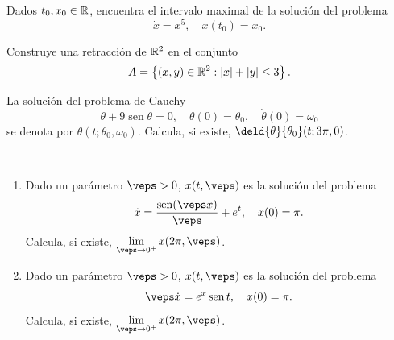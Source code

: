 \documentclass[12pt]{article}
\begin{document}
    \begin{ejercicio}
        Dados $t_0, x_0 \in \mathbb{R}$, encuentra el intervalo maximal de la solución del problema
        \[
        \dot{x} = x^5, \quad x(t_0) = x_0.
        \]
    \end{ejercicio}

    \begin{ejercicio}
        Construye una retracción de $\mathbb{R}^2$ en el conjunto
        \[
        A = \left\{(x,y) \in \mathbb{R}^2 : |x| + |y| \leq 3\right\}.
        \]
    \end{ejercicio}

    \begin{ejercicio}
        La solución del problema de Cauchy
        \[
        \ddot{\theta} + 9 \operatorname{sen} \theta = 0, \quad \theta(0) = \theta_0, \quad \dot{\theta}(0) = \omega_0
        \]
        se denota por $\theta(t; \theta_0, \omega_0)$. Calcula, si existe, $\deld{\theta}{\theta_0}(t; 3\pi, 0)$.
    \end{ejercicio}

    \begin{ejercicio}~
        \begin{enumerate}[label=\roman*)]
            \item Dado un parámetro $\veps > 0$, $x(t, \veps)$ es la solución del problema
            \[
            \dot{x} = \frac{\operatorname{sen}(\veps x)}{\veps} + e^t, \quad x(0) = \pi.
            \]
            Calcula, si existe, $\lim\limits_{\veps \to 0^+} x(2\pi, \veps)$.
            \item Dado un parámetro $\veps > 0$, $x(t, \veps)$ es la solución del problema
            \[
            \veps \dot{x} = e^x \operatorname{sen} t, \quad x(0) = \pi.
            \]
            Calcula, si existe, $\lim\limits_{\veps \to 0^+} x(2\pi, \veps)$.
        \end{enumerate}
    \end{ejercicio}

    \newpage
    \setcounter{ejercicio}{0} %
    \noindent
\end{document}
